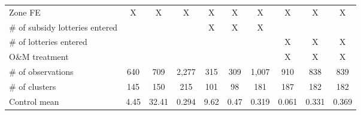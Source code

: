 \begin{tabular}{lccccccccc}
Zone FE & X & X & X & X & X & X & X & X & X \\
\# of subsidy lotteries entered &  &  &  & X & X & X &  &  &  \\
\# of lotteries entered &  &  &  &  &  &  & X & X & X \\
O\&M treatment &  &  &  &  &  &  & X & X & X \\
\# of observations & 640 & 709 & 2,277 & 315 & 309 & 1,007 & 910 & 838 & 839 \\
\# of clusters & 145 & 150 & 215 & 101 & 98 & 181 & 187 & 182 & 182 \\
Control mean & 4.45 & 32.41 & 0.294 & 9.62 & 0.47 & 0.319 & 0.061 & 0.331 & 0.369 \\
\hline
\end{tabular}
